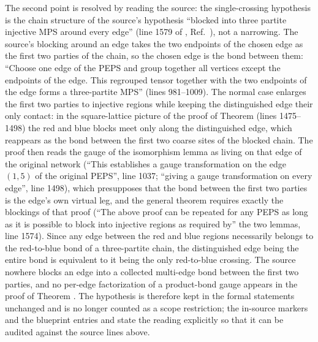 \documentclass{article}
\begin{document}
The second point is resolved by reading the source: the single-crossing
hypothesis is the chain structure of the source's hypothesis ``blocked into
three partite injective MPS around every edge'' (line 1579 of
, Ref.~\cite{Molnar2018NormalPEPS}), not a narrowing.  The source's
blocking around an edge takes the two endpoints of the chosen edge as the
first two parties of the chain, so the chosen edge is the bond between them:
``Choose one edge of the PEPS and group together all vertices except the
endpoints of the edge.  This regrouped tensor together with the two endpoints
of the edge forms a three-partite MPS'' (lines 981--1009).  The normal case
enlarges the first two parties to injective regions while keeping the
distinguished edge their only contact: in the square-lattice picture of the
proof of Theorem  (lines 1475--1498) the red and blue blocks meet
only along the distinguished edge, which reappears as the bond between the
first two coarse sites of the blocked chain.  The proof then reads the gauge
of the isomorphism lemma as living on that edge of the original network
(``This establishes a gauge transformation on the edge $(1,5)$ of the
original PEPS'', line 1037; ``giving a gauge transformation on every edge'',
line 1498), which presupposes that the bond between the first two parties is
the edge's own virtual leg, and the general theorem requires exactly the
blockings of that proof (``The above proof can be repeated for any PEPS as
long as it is possible to block into injective regions as required by''
the two lemmas, line 1574).  Since any edge between the red and blue regions
necessarily belongs to the red-to-blue bond of a three-partite chain, the
distinguished edge being the entire bond is equivalent to it being the only
red-to-blue crossing.  The source nowhere blocks an edge into a collected
multi-edge bond between the first two parties, and no per-edge factorization
of a product-bond gauge appears in the proof of Theorem .  The
hypothesis is therefore kept in the formal statements unchanged and is no
longer counted as a scope restriction; the in-source markers and the
blueprint entries  and
 state the reading explicitly so
that it can be audited against the source lines above.
\end{document}
